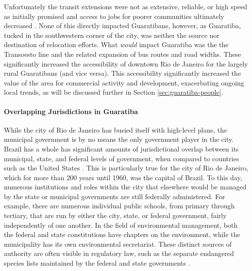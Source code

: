 Unfortunately the transit extensions were not as extensive, reliable, or high speed as initially promised \cite{wattsFuryFrustrationBrazil2014} and access to jobs for poorer communities ultimately decreased \cite{robertsonResultsAreCostly2017}. None of this directly impacted Guaratibans, however, as Guaratiba, tucked in the southwestern corner of the city, was neither the source nor destination of relocation efforts. What \textit{would} impact Guaratiba was the the Transoesto line and the related expansion of bus routes and road widths. These significantly increased the accessibility of downtown Rio de Janeiro for the largely rural Guaratibans (and vice versa). This accessibility significantly increased the value of the area for commercial activity and development, exacerbating ongoing local trends, as will be discussed further in Section \ref{sec:guaratiba-people}.

\newpage 

\paragraph{Overlapping Jurisdictions in Guaratiba} \label{sec:rio-jurisdictions} \leavevmode\newline

While the city of Rio de Janeiro has busied itself with high-level plans, the municipal government is by no means the only government player in the city. Brazil has a whole has significant amounts of jurisdictional overlap between its municipal, state, and federal levels of government, when compared to countries such as the United States \cite{coutoImitationCoercionState2018}. This is particularly true for the city of Rio de Janeiro, which for more than 200 years until 1960, was the capital of Brazil. To this day, numerous institutions and roles within the city that elsewhere would be managed by the state or municipal governments are still federally administered. For example, there are numerous individual public schools, from primary through tertiary, that are run by either the city, state, or federal government, fairly independently of one another. In the field of environmental management, both the federal and state constitutions have chapters on the environment, while the municipality has its own environmental secretariat. These distinct sources of authority are often visible in regulatory law, such as the separate endangered species lists maintained by the federal \cite{institutochicomendesdeconservacaodabiodiversidadeListaNacionalOficial2014} and state governments \cite{institutoestadualdoambienteListaEspeciesFauna}.

